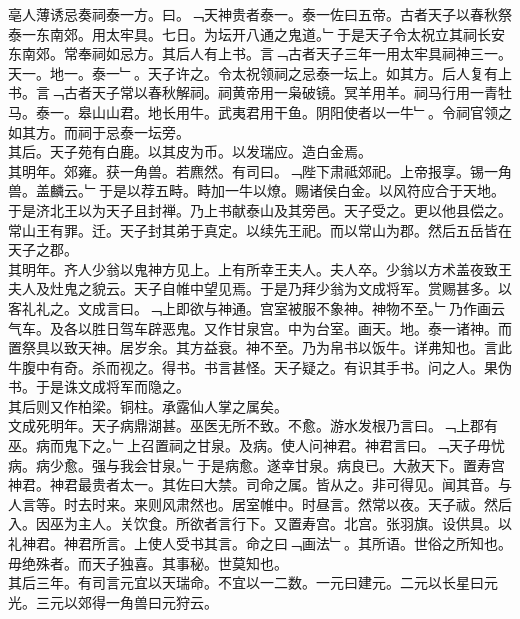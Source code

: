 \documentclass{zhvt-classic}
\begin{document}
\hspace*{2em}亳人薄诱忌奏祠泰一方。曰。﹁天神贵者泰一。泰一佐曰五帝。古者天子以春秋祭泰一东南郊。用太牢具。七日。为坛开八通之鬼道。﹂于是天子令太祝立其祠长安东南郊。常奉祠如忌方。其后人有上书。言﹁古者天子三年一用太牢具祠神三一。天一。地一。泰一﹂。天子许之。令太祝领祠之忌泰一坛上。如其方。后人复有上书。言﹁古者天子常以春秋解祠。祠黄帝用一枭破镜。冥羊用羊。祠马行用一青牡马。泰一。皋山山君。地长用牛。武夷君用干鱼。阴阳使者以一牛﹂。令祠官领之如其方。而祠于忌泰一坛旁。\\
\hspace*{2em}其后。天子苑有白鹿。以其皮为币。以发瑞应。造白金焉。\\
\hspace*{2em}其明年。郊雍。获一角兽。若麃然。有司曰。﹁陛下肃祗郊祀。上帝报享。锡一角兽。盖麟云。﹂于是以荐五畤。畤加一牛以燎。赐诸侯白金。以风符应合于天地。\\
\hspace*{2em}于是济北王以为天子且封禅。乃上书献泰山及其旁邑。天子受之。更以他县偿之。常山王有罪。迁。天子封其弟于真定。以续先王祀。而以常山为郡。然后五岳皆在天子之郡。\\
\hspace*{2em}其明年。齐人少翁以鬼神方见上。上有所幸王夫人。夫人卒。少翁以方术盖夜致王夫人及灶鬼之貌云。天子自帷中望见焉。于是乃拜少翁为文成将军。赏赐甚多。以客礼礼之。文成言曰。﹁上即欲与神通。宫室被服不象神。神物不至。﹂乃作画云气车。及各以胜日驾车辟恶鬼。又作甘泉宫。中为台室。画天。地。泰一诸神。而置祭具以致天神。居岁余。其方益衰。神不至。乃为帛书以饭牛。详弗知也。言此牛腹中有奇。杀而视之。得书。书言甚怪。天子疑之。有识其手书。问之人。果伪书。于是诛文成将军而隐之。\\
\hspace*{2em}其后则又作柏梁。铜柱。承露仙人掌之属矣。\\
\hspace*{2em}文成死明年。天子病鼎湖甚。巫医无所不致。不愈。游水发根乃言曰。﹁上郡有巫。病而鬼下之。﹂上召置祠之甘泉。及病。使人问神君。神君言曰。﹁天子毋忧病。病少愈。强与我会甘泉。﹂于是病愈。遂幸甘泉。病良已。大赦天下。置寿宫神君。神君最贵者太一。其佐曰大禁。司命之属。皆从之。非可得见。闻其音。与人言等。时去时来。来则风肃然也。居室帷中。时昼言。然常以夜。天子祓。然后入。因巫为主人。关饮食。所欲者言行下。又置寿宫。北宫。张羽旗。设供具。以礼神君。神君所言。上使人受书其言。命之曰﹁画法﹂。其所语。世俗之所知也。毋绝殊者。而天子独喜。其事秘。世莫知也。\\
\hspace*{2em}其后三年。有司言元宜以天瑞命。不宜以一二数。一元曰建元。二元以长星曰元光。三元以郊得一角兽曰元狩云。\\
\end{document}
